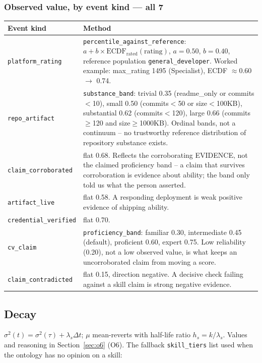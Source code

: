\documentclass[10pt,a4paper]{article}
\begin{document}
\subsubsection*{Observed value, by event kind --- all 7}
\begin{center}\small
\begin{tabular}{@{}L{3.2cm}L{9.6cm}@{}}
\toprule
\textbf{Event kind} & \textbf{Method} \\
\midrule
\texttt{platform\_rating} & \texttt{percentile\_against\_reference}: $a+b\times\text{ECDF}_{\text{rated}}(\text{rating})$, $a=0.50$, $b=0.40$, reference population \texttt{general\_developer}. Worked example: max\_rating 1495 (Specialist), ECDF $\approx$0.60 $\to$ 0.74. \\
\texttt{repo\_artifact} & \texttt{substance\_band}: trivial 0.35 (readme\_only or commits$<$10), small 0.50 (commits$<$50 or size$<$100KB), substantial 0.62 (commits$<$120), large 0.66 (commits$\geq$120 and size$\geq$1000KB). Ordinal bands, not a continuum -- no trustworthy reference distribution of repository substance exists. \\
\texttt{claim\_corroborated} & flat 0.68. Reflects the corroborating EVIDENCE, not the claimed proficiency band -- a claim that survives corroboration is evidence about ability; the band only told us what the person asserted. \\
\texttt{artifact\_live} & flat 0.58. A responding deployment is weak positive evidence of shipping ability. \\
\texttt{credential\_verified} & flat 0.70. \\
\texttt{cv\_claim} & \texttt{proficiency\_band}: familiar 0.30, intermediate 0.45 (default), proficient 0.60, expert 0.75. Low reliability (0.20), not a low observed value, is what keeps an uncorroborated claim from moving a score. \\
\texttt{claim\_contradicted} & flat 0.15, direction negative. A decisive check failing against a skill claim is strong negative evidence. \\
\bottomrule
\end{tabular}
\end{center}

\subsection{Decay}
$\sigma^2(t)=\sigma^2(\tau)+\lambda_s\Delta t$; $\mu$ mean-reverts with
half-life ratio $h_s=k/\lambda_s$. Values and reasoning in
Section~\ref{sec:o6} (O6). The fallback \texttt{skill\_tiers} list used when
the ontology has no opinion on a skill:
\end{document}
